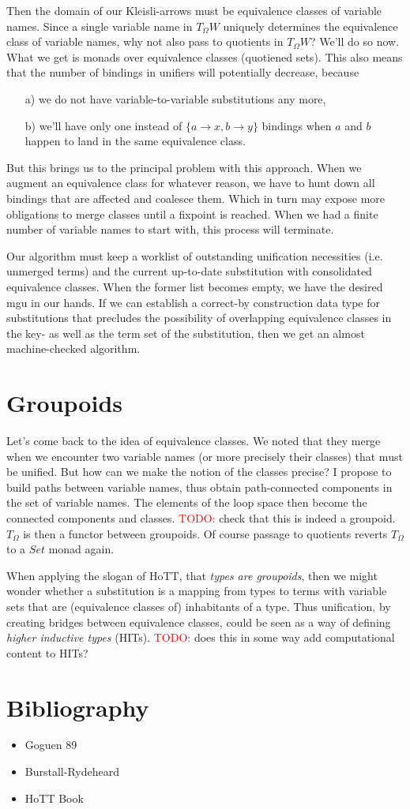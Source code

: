 \documentclass{article}
\newcommand \todo[1] {\textcolor{red}{TODO: }#1}
\begin{document}
Then the domain of our Kleisli-arrows must be equivalence classes of variable names. Since a single variable name in $T_{\Omega}W$ uniquely determines the equivalence class of variable names, why not also pass to quotients in $T_{\Omega}W$?
We'll do so now. What we get is monads over equivalence classes (quotiened sets). This also means that the number of bindings in unifiers will potentially decrease, because
\begin{itemize}
\item[a)] we do not have variable-to-variable substitutions any more,
\item[b)] we'll have only one instead of $\{a \to x, b \to y\}$ bindings when $a$ and $b$ happen to land in the same equivalence class.
\end{itemize}
But this brings us to the principal problem with this approach. When we augment an equivalence class for whatever reason, we have to hunt down all bindings that are affected and coalesce them. Which in turn may expose more obligations to merge classes until a fixpoint is reached. When we had a finite number of variable names to start with, this process will terminate.
\par Our algorithm must keep a worklist of outstanding unification necessities (i.e. unmerged terms) and the current up-to-date substitution with consolidated equivalence classes.
When the former list becomes empty, we have the desired mgu in our hands.
If we can establish a correct-by construction data type for substitutions that precludes the possibility of overlapping equivalence classes in the key- as well as the term set of the substitution, then we get an almost machine-checked algorithm.

\section {Groupoids}
Let's come back to the idea of equivalence classes. We noted that they merge when we encounter two variable names (or more precisely their classes) that must be unified. But how can we make the notion of the classes precise? I propose to build paths between variable names, thus obtain path-connected components in the set of variable names. The elements of the loop space then become the connected components and classes. \todo {check that this is indeed a groupoid.} $T_{\Omega}$ is then a functor between groupoids. Of course passage to quotients reverts $T_{\Omega}$ to a $Set$ monad again.
\par When applying the slogan of HoTT, that \emph {types are groupoids}, then we might wonder whether a substitution is a mapping from types to terms with variable sets that are (equivalence classes of) inhabitants of a type. Thus unification, by creating bridges between equivalence classes, could be seen as a way of defining \emph {higher inductive types} (HITs). \todo {does this in some way add computational content to HITs?}

\section {Bibliography}
\begin{itemize}
\item Goguen 89
\item Burstall-Rydeheard
\item HoTT Book
\end{itemize}
\end{document}
